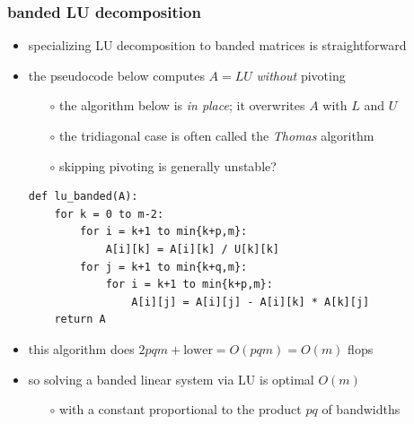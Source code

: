 \documentclass[10pt,
               svgnames,
               hyperref={colorlinks,citecolor=DeepPink4,linkcolor=FireBrick,urlcolor=Maroon},
               usepdftitle=false]{beamer}
\begin{document}
\begin{frame}[fragile]
\frametitle{banded LU decomposition}

\begin{itemize}
\item specializing LU decomposition to banded matrices is straightforward
\item the pseudocode below computes $A=LU$ \emph{without} pivoting
   \begin{itemize}
   \item[$\circ$] the algorithm below is \emph{in place}; it overwrites $A$ with $L$ and $U$
   \item[$\circ$] the tridiagonal case is often called the \emph{Thomas} algorithm
   \item[$\circ$] skipping pivoting is generally unstable?
   \end{itemize}

\medskip
\begin{center}
\begin{minipage}{0.8\textwidth}
\begin{verbatim}
def lu_banded(A):
    for k = 0 to m-2:
        for i = k+1 to min{k+p,m}:
            A[i][k] = A[i][k] / U[k][k]
        for j = k+1 to min{k+q,m}:
            for i = k+1 to min{k+p,m}:
                A[i][j] = A[i][j] - A[i][k] * A[k][j]
    return A
\end{verbatim}
\end{minipage}
\end{center}

\bigskip
\item this algorithm does \quad $2pqm + \text{lower} = O(pqm) = O(m)$ \quad flops
\item so solving a banded linear system via LU is optimal $O(m)$
   \begin{itemize}
   \item[$\circ$] with a constant proportional to the product $pq$ of bandwidths
   \end{itemize}
\end{itemize}
\end{frame}
\end{document}
